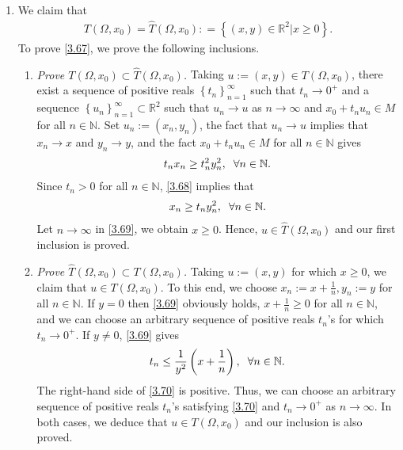 \documentclass[a4paper]{article}
\numberwithin{equation}{section}
\begin{document}
\begin{enumerate}
\item We claim that 
\begin{align}
\label{3.67}
T\left( {\Omega ,{x_0}} \right) = \widehat T\left( {\Omega ,{x_0}} \right): = \left\{ {\left( {x,y} \right) \in {\mathbb{R}^2}|x \ge 0} \right\}.
\end{align}
To prove \eqref{3.67}, we prove the following inclusions.
\begin{enumerate}
\item \textit{Prove $T\left( {\Omega ,{x_0}} \right) \subset \widehat T\left( {\Omega ,{x_0}} \right)$.} Taking $u:=\left(x,y\right)\in T\left(\Omega,x_0\right)$, there exist a sequence of positive reals $\left\{ {{t_n}} \right\}_{n = 1}^\infty $ such that $t_n\to 0^+$ and a sequence $\left\{ {{u_n}} \right\}_{n = 1}^\infty  \subset {\mathbb{R}^2}$ such that $u_n\to u$ as $n\to \infty$ and $x_0+t_nu_n\in M$ for all $n\in \mathbb{N}$. Set $u_n:=\left(x_n,y_n\right)$, the fact that $u_n\to u$ implies that $x_n\to x$ and $y_n\to y$, and the fact $x_0+t_nu_n\in M$ for all $n\in \mathbb{N}$ gives
\begin{align}
\label{3.68}
{t_n}{x_n} \ge t_n^2y_n^2,\hspace{0.2cm}\forall n \in \mathbb{N}.
\end{align}
Since $t_n>0$ for all $n\in \mathbb{N}$, \eqref{3.68} implies that
\begin{align}
\label{3.69}
{x_n} \ge {t_n}y_n^2,\hspace{0.2cm}\forall n \in \mathbb{N}.
\end{align}
Let $n\to \infty$ in \eqref{3.69}, we obtain $x\ge 0$. Hence, $u\in \widehat{T}\left(\Omega,x_0\right)$ and our first inclusion is proved.
\item \textit{Prove $\widehat T\left( {\Omega ,{x_0}} \right) \subset T\left( {\Omega ,{x_0}} \right)$.} Taking $u:=\left(x,y\right)$ for which $x\ge 0$, we claim that $u\in T\left(\Omega,x_0\right)$. To this end, we choose $x_n:=x+\frac{1}{n},y_n:=y$ for all $n\in \mathbb{N}$. If $y=0$ then \eqref{3.69} obviously holds, $x+\frac{1}{n}\ge 0$ for all $n\in \mathbb{N}$, and we can choose an arbitrary sequence of positive reals $t_n$'s for which $t_n\to 0^+$. If $y\ne 0$, \eqref{3.69} gives
\begin{align}
\label{3.70}
{t_n} \le \frac{1}{{{y^2}}}\left( {x + \frac{1}{n}} \right),\hspace{0.2cm}\forall n \in \mathbb{N}.
\end{align}
The right-hand side of \eqref{3.70} is positive. Thus, we can choose an arbitrary sequence of positive reals $t_n$'s satisfying \eqref{3.70} and $t_n\to 0^+$ as $n\to \infty$. In both cases, we deduce that $u\in T\left(\Omega,x_0\right)$ and our inclusion is also proved.

\end{enumerate}
\end{enumerate}
\end{document}
